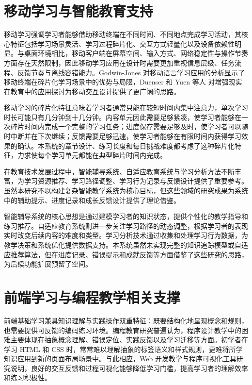 \section{移动学习与智能教育支持}

移动学习强调学习者能够借助移动终端在不同时间、不同地点完成学习活动，其核心特征包括学习场景灵活、学习过程碎片化、交互方式轻量化以及设备依赖性明显。与桌面环境相比，移动客户端在屏幕空间、输入方式、网络稳定性与操作节奏方面存在天然限制，因此移动学习应用在设计时需要更加重视信息层级、任务流程、反馈节奏与离线容错能力。Godwin-Jones\cite{godwinjones2011} 对移动语言学习应用的分析显示了移动终端在碎片化学习场景中的优势与局限，Duenser\cite{duenser2012} 和 Yuen 等人\cite{yuen2011} 对增强现实在教育中的应用探讨为移动交互设计提供了更广阔的思路\cite{liang2018,jiao2023}。

移动学习的碎片化特征意味着学习者通常只能在较短时间内集中注意力，单次学习时长可能只有几分钟到十几分钟。内容单元因此需要足够紧凑，使学习者能够在一次碎片时间内完成一个完整的学习任务；进度保存需要足够及时，使学习者可以随时中断并在下次继续；反馈需要足够迅速，使学习者能够在有限时间内获得学习效果的确认。本系统的章节设计、练习长度和每日挑战难度都考虑了这种碎片化特征，力求使每个学习单元都能在典型碎片时间内完成。

在教育技术发展过程中，智能辅导系统、自适应教育系统与学习分析方法不断丰富，为学习资源推荐、学习路径调整、学习行为记录与反馈设计提供了重要参考。虽然本研究不以构建复杂智能教学系统为核心目标，但这些领域的研究成果为系统中的辅助提示、进度记录和成长反馈设计提供了理论借鉴\cite{koedinger1997,woolf2010,brusilovsky2007,papamitsiou2014}。

智能辅导系统的核心思想是通过建模学习者的知识状态，提供个性化的教学指导和练习推荐。自适应教育系统则进一步关注学习路径的动态调整，根据学习者的表现实时改变后续内容的难度和类型。学习分析技术通过收集和处理学习行为数据，为教学决策和系统优化提供数据支持。本系统虽然未实现完整的知识追踪模型或自适应推荐算法，但在进度记录、错误提示和成就反馈等方面借鉴了这些研究的思路，为后续功能扩展预留了空间。

\section{前端学习与编程教学相关支撑}

前端基础学习兼具知识理解与实践操作双重特征：既要结构化地呈现概念和规则，也需要提供可反馈的编码练习环境。编程教育研究普遍认为，程序设计教学中的困难主要体现在抽象概念理解、错误定位、实践反馈以及学习迁移等方面。初学者在学习 HTML 和 CSS 时，常常难以理解抽象的标签语义和样式规则，更难将所学知识应用到新的页面布局场景中。与此相应，Web 开发教学与程序可视化工具研究说明，良好的交互反馈和过程可视化能够降低学习门槛，提高学习者的理解效率和练习积极性\cite{robins2003,heines2001,guo2013}。

